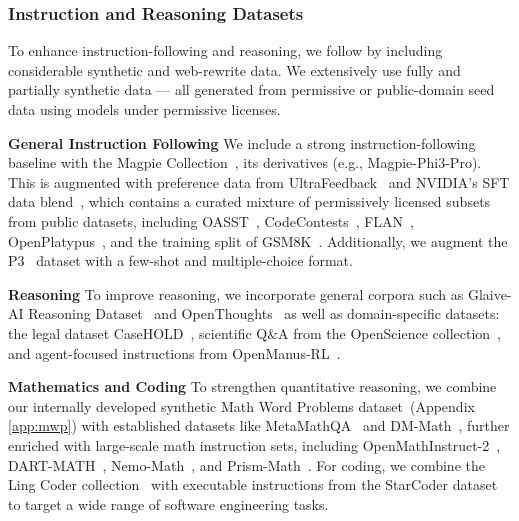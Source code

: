 \subsubsection{Instruction and Reasoning Datasets}
To enhance instruction-following and reasoning, we follow \cite{abdin2024phi4technicalreport} by including considerable synthetic and web-rewrite data. We extensively use fully and partially synthetic data --- all generated from permissive or public-domain seed data using models under permissive licenses.%


\textbf{General Instruction Following} We include a strong instruction-following baseline with the Magpie Collection~\citep{xu2024magpiealignmentdatasynthesis}, its derivatives (e.g., Magpie-Phi3-Pro). This is augmented with preference data from UltraFeedback~\citep{cui2024ultrafeedback} and NVIDIA's SFT data blend~\cite{nvidia_sft_datablend_v1}, which contains a curated mixture of permissively licensed subsets from public datasets, including OASST~\citep{köpf2023openassistant}, CodeContests~\citep{Li_2022}, FLAN~\citep{chung2022scalinginstructionfinetunedlanguagemodels}, OpenPlatypus~\citep{platypus2023}, and the training split of GSM8K~\citep{cobbe2021training}. Additionally, we augment the P3~\citep{sanh2021multitask} dataset with a few-shot and multiple-choice format.

\textbf{Reasoning} To improve reasoning, we incorporate general corpora such as Glaive-AI Reasoning Dataset~\citep{glaive_reasoning_2023} and OpenThoughts~\citep{guha2025openthoughts} as well as domain-specific datasets: the legal dataset CaseHOLD~\citep{zheng2021does}, scientific Q\&A from the OpenScience collection~\citep{NVIDIAOpenScience2025}, and agent-focused instructions from OpenManus-RL~\citep{openmanus_rl}.

\textbf{Mathematics and Coding} To strengthen quantitative reasoning, we combine our internally developed synthetic Math Word Problems dataset~(Appendix \ref{app:mwp}) with established datasets like MetaMathQA~\citep{yu2024metamathbootstrapmathematicalquestions} and DM-Math~\citep{saxton2019analysingmathematicalreasoningabilities}, further enriched with large-scale math instruction sets, including OpenMathInstruct-2~\citep{toshniwal2024openmathinstruct118millionmath}, DART-MATH~\citep{tong2024dartmath}, Nemo-Math~\citep{mahabadi2025nemotron}, and Prism-Math~\citep{nvidia2025prismmath}.
 For coding, we combine the Ling Coder collection~\cite{codefuse2025samplemattersleveragingmixtureofexperts} with executable instructions from the StarCoder dataset~\cite{kocetkov2023the} to target a wide range of software engineering tasks.
 
